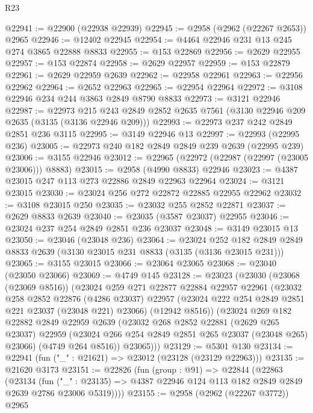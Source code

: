 \begin{lexlean}{R23}
\begin{coremodule}
@22941 := @22900 (@22938 @22939)
@22945 := @2958 (@2962 (@22267 @2653)) @2965
@22946 := @12402 @22945
@22954 := @4464 @22946 @231 @13 @245 @274 @3865 @22888 @8833
@22955 := @153 @22869
@22956 := @2629 @22955
@22957 := @153 @22874
@22958 := @2629 @22957
@22959 := @153 @22879
@22961 := @2629 @22959 @2639
@22962 := @22958 @22961
@22963 := @22956 @22962
@22964 := @2652 @22963
@22965 := @22954 @22964
@22972 := @3108 @22946 @234 @244 @3863 @2849 @8790 @8833
@22973 := @3121 @22946
@22987 := @22973
    @215
    @243
    @2849
    @2852
    @2635
    @7561
    (@3130 @22946 @209 @2635 (@3135 (@3136 @22946 @209)))
@22993 := @22973 @237 @242 @2849 @2851 @236 @3115
@22995 := @3149 @22946 @13
@22997 := @22993 (@22995 @236)
@23005 := @22973 @240 @182 @2849 @2849 @239 @2639 (@22995 @239)
@23006 := @3155 @22946
@23012 := @22965 (@22972 (@22987 (@22997 (@23005 @23006))) @8883)
@23015 := @2958 (@4990 @8833) @22946
@23023 := @4387 @23015 @247 @113 @273 @22886 @2849 @22963 @22964
@23024 := @3121 @23015
@23030 := @23024 @256 @272 @22872 @22885 @22955 @22962
@23032 := @3108 @23015 @250
@23035 := @23032 @255 @2852 @22871
@23037 := @2629 @8833 @2639
@23040 := @23035 (@3587 @23037) @22955
@23046 := @23024 @237 @254 @2849 @2851 @236 @23037
@23048 := @3149 @23015 @13
@23050 := @23046 (@23048 @236)
@23064 := @23024
    @252
    @182
    @2849
    @2849
    @8833
    @2639
    (@3130 @23015 @231 @8833 (@3135 (@3136 @23015 @231)))
@23065 := @3155 @23015
@23066 := @23064 @23065
@23068 := @23040 (@23050 @23066)
@23069 := @4749 @145
@23128 := @23023
    (@23030
      (@23068 (@23069 @8516))
      (@23024
        @259
        @271
        @22877
        @22884
        @22957
        @22961
        (@23032
          @258
          @2852
          @22876
          (@4286 @23037)
          @22957
          (@23024 @222 @254 @2849 @2851 @221 @23037 (@23048 @221) @23066)
          (@12942 @8516))
        (@23024
          @269
          @182
          @22882
          @2849
          @22959
          @2639
          (@23032
            @268
            @2852
            @22881
            (@2629 @265 @23037)
            @22959
            (@23024 @266 @254 @2849 @2851 @265 @23037 (@23048 @265) @23066)
            (@4749 @264 @8516))
          @23065)))
@23129 := @5301 @130
@23134 := @22941 (fun ("_" : @21621) => @23012 (@23128 (@23129 @22963)))
@23135 := @21620 @3173
@23151 := @22826
    (fun (group : @91) =>
    @22844
      (@22863
        (@23134
          (fun ("_" : @23135) =>
          @4387 @22946 @124 @113 @182 @2849 @2849 @2639 @2786 @23006 @5319))))
@23155 := @2958 (@2962 (@22267 @3772)) @2965

\end{coremodule}
\end{lexlean}
